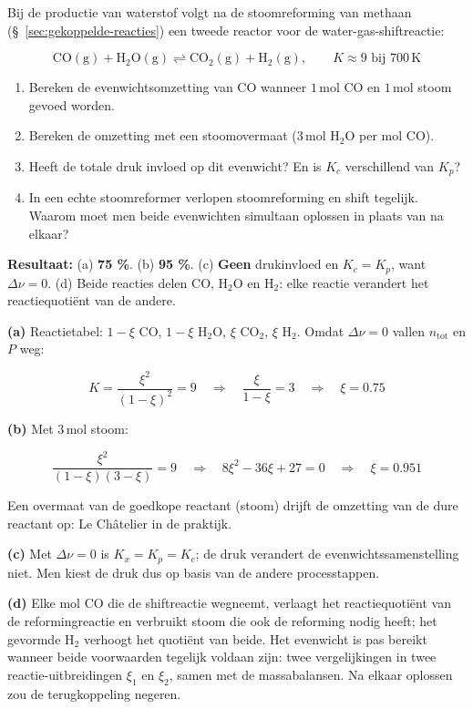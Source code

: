 \begin{oefening}
Bij de productie van waterstof volgt na de stoomreforming van methaan (\S~\ref{sec:gekoppelde-reacties}) een tweede reactor voor de water-gas-shiftreactie:

\[
\mathrm{CO(g) + H_2O(g) \rightleftharpoons CO_2(g) + H_2(g)}, \qquad K \approx 9 \text{ bij } 700\,\mathrm{K}
\]

\begin{enumerate}
\item[(a)]
  Bereken de evenwichtsomzetting van CO wanneer \(1\,\mathrm{mol}\) CO en \(1\,\mathrm{mol}\) stoom gevoed worden.
\item[(b)]
  Bereken de omzetting met een stoomovermaat (\(3\,\mathrm{mol}\) \(\mathrm{H_2O}\) per mol CO).
\item[(c)]
  Heeft de totale druk invloed op dit evenwicht? En is \(K_c\) verschillend van \(K_p\)?
\item[(d)]
  In een echte stoomreformer verlopen stoomreforming en shift tegelijk. Waarom moet men beide evenwichten simultaan oplossen in plaats van na elkaar?
\end{enumerate}
\end{oefening}
\begin{oplossing}
\textbf{Resultaat:} (a) \textbf{75 \%}. (b) \textbf{95 \%}. (c) \textbf{Geen} drukinvloed en \(K_c = K_p\), want \(\Delta\nu = 0\). (d) Beide reacties delen CO, H\ensuremath{_{2}}O en H\ensuremath{_{2}}: elke reactie verandert het reactiequotiënt van de andere.

\textbf{(a)} Reactietabel: \(1-\xi\) CO, \(1-\xi\) \(\mathrm{H_2O}\), \(\xi\) \(\mathrm{CO_2}\), \(\xi\) \(\mathrm{H_2}\). Omdat \(\Delta\nu = 0\) vallen \(n_{\text{tot}}\) en \(P\) weg:

\[
K = \frac{\xi^2}{(1-\xi)^2} = 9 \quad\Rightarrow\quad \frac{\xi}{1-\xi} = 3 \quad\Rightarrow\quad \xi = 0.75
\]

\textbf{(b)} Met \(3\,\mathrm{mol}\) stoom:

\[
\frac{\xi^2}{(1-\xi)(3-\xi)} = 9 \quad\Rightarrow\quad 8\xi^2 - 36\xi + 27 = 0 \quad\Rightarrow\quad \xi = 0.951
\]

Een overmaat van de goedkope reactant (stoom) drijft de omzetting van de dure reactant op: Le Châtelier in de praktijk.

\textbf{(c)} Met \(\Delta\nu = 0\) is \(K_x = K_p = K_c\); de druk verandert de evenwichtssamenstelling niet. Men kiest de druk dus op basis van de andere processtappen.

\textbf{(d)} Elke mol CO die de shiftreactie wegneemt, verlaagt het reactiequotiënt van de reformingreactie en verbruikt stoom die ook de reforming nodig heeft; het gevormde \(\mathrm{H_2}\) verhoogt het quotiënt van beide. Het evenwicht is pas bereikt wanneer beide voorwaarden tegelijk voldaan zijn: twee vergelijkingen in twee reactie-uitbreidingen \(\xi_1\) en \(\xi_2\), samen met de massabalansen. Na elkaar oplossen zou de terugkoppeling negeren.
\end{oplossing}

